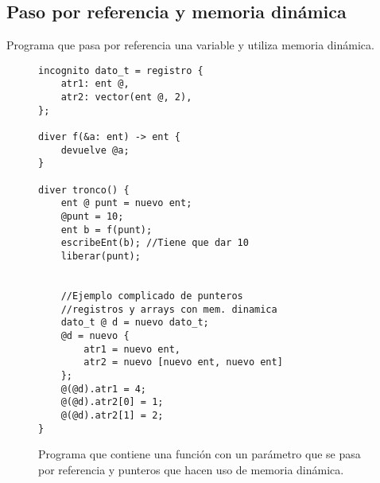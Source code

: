 \subsection{Paso por referencia y memoria dinámica}
Programa que pasa por referencia una variable y utiliza memoria dinámica.
\begin{figure}[htbp]
    \centering
    \begin{lstlisting}
incognito dato_t = registro {
    atr1: ent @,
    atr2: vector(ent @, 2),
};

diver f(&a: ent) -> ent {
    devuelve @a;
}

diver tronco() {
    ent @ punt = nuevo ent;
    @punt = 10;
    ent b = f(punt);
    escribeEnt(b); //Tiene que dar 10
    liberar(punt);


    //Ejemplo complicado de punteros
    //registros y arrays con mem. dinamica
    dato_t @ d = nuevo dato_t;
    @d = nuevo {
        atr1 = nuevo ent,
        atr2 = nuevo [nuevo ent, nuevo ent]
    };
    @(@d).atr1 = 4;
    @(@d).atr2[0] = 1;
    @(@d).atr2[1] = 2;
}
    \end{lstlisting}
    \caption{Programa que contiene una función con un parámetro que se pasa por
    referencia y punteros que hacen uso de memoria dinámica.}
\end{figure}
